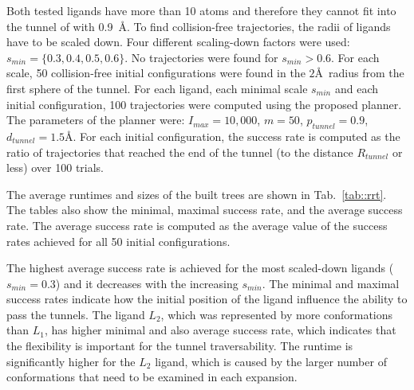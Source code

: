 \documentclass{svmult}
\def\dt{d_{tunnel}}
\def\rv{R_{tunnel}}
\def\Imax{I_{max}} %
\def\smin{s_{min}}
\def\gb{p_{tunnel}}
\def\LA{L_1}
\def\LB{L_2}
\begin{document}
Both tested ligands have more than 10 atoms and therefore they cannot fit into the tunnel of with 0.9~\AA.
To find collision-free trajectories, the radii of ligands have to be scaled down. 
Four different scaling-down factors were used: $\smin=\{0.3,0.4,0.5,0.6\}$.
No trajectories were found for $\smin > 0.6$.
For each scale, 50 collision-free initial configurations were found in the $2$\AA\ radius from the first sphere of the tunnel.
For each ligand, each minimal scale $\smin$ and each initial configuration, 100 trajectories were computed using the proposed planner.
The parameters of the planner were: $\Imax=10,000$, $m=50$, $\gb=0.9$, $\dt=1.5$\AA.
For each initial configuration, the success rate is computed as the ratio of trajectories that reached the end of the tunnel (to the distance $\rv$ or less) over 100 trials.

The average runtimes and sizes of the built trees are shown in Tab.~\ref{tab::rrt}.
The tables also show the minimal, maximal success rate, and the average success rate.
The average success rate is computed as the average value of the success rates achieved for all 50 initial configurations.

The highest average success rate is achieved for the most scaled-down ligands ($\smin=0.3$) and it decreases with the increasing $\smin$. 
The minimal and maximal success rates indicate how the initial position of the ligand influence the ability to pass the tunnels.
The ligand $\LB$, which was represented by more conformations than $\LA$, has higher minimal and also average success rate, which
indicates that the flexibility is important for the tunnel traversability.
The runtime is significantly higher for the $\LB$ ligand, which is caused by the larger number of conformations that need to be
examined in each expansion.


\def\tmpa{0.13\textwidth}
\end{document}
